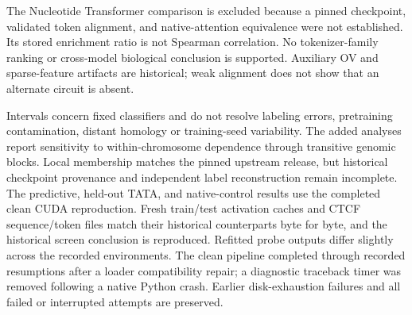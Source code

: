 The Nucleotide Transformer comparison is excluded because a pinned checkpoint, validated token alignment, and native-attention equivalence were not established. Its stored enrichment ratio is not Spearman correlation. No tokenizer-family ranking or cross-model biological conclusion is supported. Auxiliary OV and sparse-feature artifacts are historical; weak alignment does not show that an alternate circuit is absent.

Intervals concern fixed classifiers and do not resolve labeling errors, pretraining contamination, distant homology or training-seed variability. The added analyses report sensitivity to within-chromosome dependence through transitive genomic blocks. Local membership matches the pinned upstream release, but historical checkpoint provenance and independent label reconstruction remain incomplete. The predictive, held-out TATA, and native-control results use the completed clean CUDA reproduction. Fresh train/test activation caches and CTCF sequence/token files match their historical counterparts byte for byte, and the historical screen conclusion is reproduced. Refitted probe outputs differ slightly across the recorded environments. The clean pipeline completed through recorded resumptions after a loader compatibility repair; a diagnostic traceback timer was removed following a native Python crash. Earlier disk-exhaustion failures and all failed or interrupted attempts are preserved.
